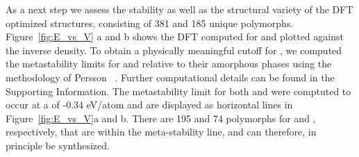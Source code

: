 %
%
As a next step we assess the stability as well as the structural variety of the DFT optimized structures, consisting of 381 \IrOtwo and 185 \IrOthree unique polymorphs.
%
Figure~\ref{fig:E_vs_V} a and b shows the DFT computed \DHf for \IrOtwo and \IrOthree plotted against the inverse density.
%
To obtain a physically meaningful cutoff for \DHf, we computed the metastability limits for \IrOtwo and \IrOthree relative to their amorphous phases using the methodology of Persson ~\cite{Aykol2018}.
%
Further computational details can be found in the Supporting Information.
%
The metastability limit for both \IrOtwo and \IrOthree were comptuted to occur at a \DHf of -0.34 eV/atom and are displayed as horizontal lines in Figure~\ref{fig:E_vs_V}a and b.
%
There are 195 and 74 polymorphs for \IrOtwo and \IrOthree, respectively, that are within the meta-stability line, and can therefore, in principle be synthesized.
%
%


